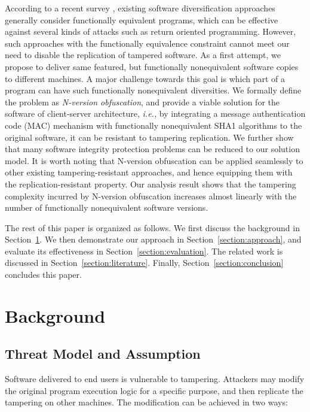 \documentclass[10pt, conference]{IEEEtran}
\begin{document}
According to a recent survey \cite{larsen2015automatic}, existing software diversification approaches generally consider functionally equivalent programs, which can be effective against several kinds of attacks such as return oriented programming.  However, such approaches with the functionally equivalence constraint cannot meet our need to disable the replication of tampered software.  As a first attempt, we propose to deliver same featured, but functionally nonequivalent software copies to different machines.  A major challenge towards this goal is which part of a program can have such functionally nonequivalent diversities.  We formally define the problem as \textit{N-version obfuscation}, and provide a viable solution for the software of client-server architecture, \textit{i.e.,} by integrating a message authentication code (MAC) mechanism with functionally nonequivalent SHA1 algorithms \cite{sha1} to the original software, it can be resistant to tampering replication.  We further show that many software integrity protection problems can be reduced to our solution model.  It is worth noting that N-version obfuscation can be applied seamlessly to other existing tampering-resistant approaches, and hence equipping them with the replication-resistant property.  Our analysis result shows that the tampering complexity incurred by N-version obfuscation increases almost linearly with the number of functionally nonequivalent software versions.

The rest of this paper is organized as follows.  We first discuss the background in Section~\ref{section:motivation}.  We then demonstrate our approach in Section~\ref{section:approach}, and evaluate its effectiveness in  Section~\ref{section:evaluation}.  The related work is discussed in Section~\ref{section:literature}.  Finally, Section~\ref{section:conclusion} concludes this paper.

\section{Background} \label{section:motivation}
\subsection{Threat Model and Assumption} \label{section:threat}
Software delivered to end users is vulnerable to tampering.  Attackers may modify the original program execution logic for a specific purpose, and then replicate the tampering on other machines.  The modification can be achieved in two ways:
\end{document}
